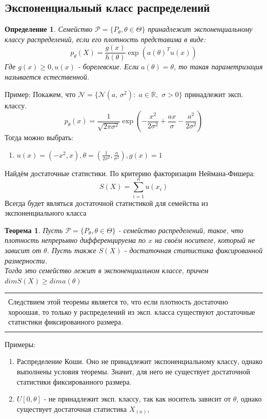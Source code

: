 \documentclass[a4paper,12pt]{article}
\newcommand{\orst}[2]{#1_{(#2)}}
\newcommand{\normal}[2]{\mathcal{N}(#1,\,#2)}
\newcommand{\sumin}{\sum\limits_{i=1}^n}
\newcommand{\R}{\mathbb{R}}
\newenvironment{annotation}{\begin{center}
    \begin{tabular}{|p{0.9\textwidth}|}
    \hline\\
}
{ 
    \\\\\hline
    \end{tabular} 
    \end{center}
}
\newtheorem{dfn}{Определение}[section]
\theoremstyle{named}
\newtheorem*{namedtheorem}{Теорема}
\begin{document}
\subsection{Экспоненциальный класс распределений}
\begin{dfn}
    Семейство $\mathcal{P} = \{P_\theta, \theta \in \Theta \}$ принадлежит экспоненциальному классу распределений, если его плотность 
    представима в виде:
    $$
        p_\theta(X) = \frac{g(x)}{h(\theta)}\exp(a(\theta)^Tu(x))
    $$
    Где $g(x) \geq 0, u(x)$ - борелевские. Если $a(\theta) = \theta$, то такая параметризация называется естественной. 
\end{dfn}
Пример: Покажем, что $\mathcal{N} = \{\normal{a}{\sigma^2}: \,\, a\in \R, \,\, \sigma > 0 \}$  принадлежит эксп. классу. 
$$
    p_\theta(x) = \frac{1}{\sqrt{2\pi \sigma^2}}\exp(-\frac{x^2}{2\sigma^2} + \frac{ax}{\sigma} - \frac{a^2}{2\sigma^2})
$$
Тогда можно выбрать:
\begin{enumerate}
    \item $u(x) = (-x^2, x), \theta = \left(\frac{1}{2\sigma^2}, \frac{a}{\sigma^2}\right), g(x) = 1$
\end{enumerate}
Найдём достаточные статистики. По критерию факторизации Неймана-Фишера: 
$$
    S(X) = \sumin u(x_i)
$$
Всегда будет являться достаточной статистикой для семейства из экспоненциального класса
\begin{namedtheorem}
    Пусть $\mathcal{P} = \{P_\theta, \theta \in \Theta\}$ - семейство распределений, такое, что плотность непрерывно дифференцируема 
    по $x$ на своём носителе, который не зависит от $\theta$. Пусть также $S(X)$ - достаточная статистика фиксированной размерности. \\ 
    Тогда это семейство лежит в экспоненциальном классе, причем $dim S(X) \geq dim a(\theta)$
\end{namedtheorem}
\begin{annotation}
    Следствием этой теоремы является то, что если плотность достаточно хороошая, то только у распределений из эксп. класса существуют достаточные 
    статистики фиксированного размера. 
\end{annotation}
Примеры: 
\begin{enumerate}
    \item Распределение Коши. Оно не принадлежит экспоненциальному классу, однако выполнены условия теоремы. Значит, для него не существует 
    достаточной статистики фиксированного размера.
    \item $U[0, \theta]$ - не принадлежит эксп. классу, так как носитель зависит от $\theta$, однако существует достаточная статистика $\orst{X}{n}$,
\end{enumerate}
\end{document}
